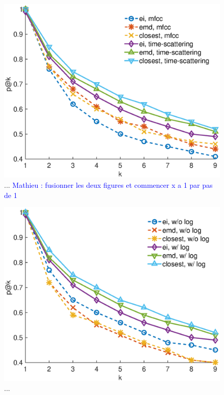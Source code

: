 \documentclass[journal]{IEEEtran}
\newcommand{\ml}[1]{\textcolor{blue}{ Mathieu : #1}}
\begin{document}
\begin{figure}
\begin{center}
\includegraphics[width=\columnwidth]{gfx/unsupervised_test1.eps}
\caption{... \ml{fusionner les deux figures et commencer x a 1 par pas de 1}}
\end{center}
\end{figure}

\begin{figure}
\begin{center}
\includegraphics[width=\columnwidth]{gfx/unsupervised_test2.eps}
\caption{...}
\end{center}
\end{figure}
\end{document}
